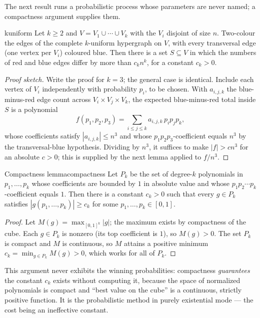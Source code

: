 The next result runs a probabilistic process whose parameters are never named;
a compactness argument supplies them.

\begin{theorem}{}{kuniform}
Let $k\ge2$ and $V=V_1\cup\cdots\cup V_k$ with the $V_i$ disjoint of size $n$.
Two-colour the edges of the complete $k$-uniform hypergraph on $V$, with every
transversal edge (one vertex per $V_i$) coloured blue. Then there is a set
$S\subseteq V$ in which the numbers of red and blue edges differ by more than
$c_k n^k$, for a constant $c_k>0$.
\end{theorem}

\begin{proof}[Proof sketch]
Write the proof for $k=3$; the general case is identical. Include each vertex
of $V_i$ independently with probability $p_i$, to be chosen. With
$a_{i,j,k}$ the blue-minus-red edge count across $V_i\times V_j\times V_k$,
the expected blue-minus-red total inside $S$ is a polynomial
\[
  f(p_1,p_2,p_3)=\sum_{i\le j\le k}a_{i,j,k}\,p_ip_jp_k,
\]
whose coefficients satisfy $|a_{i,j,k}|\le n^3$ and whose
$p_1p_2p_3$-coefficient equals $n^3$ by the transversal-blue hypothesis.
Dividing by $n^3$, it suffices to make $|f|>cn^3$ for an absolute $c>0$; this
is supplied by the next lemma applied to $f/n^3$.
\end{proof}

\begin{lemma}{Compactness lemma}{compactness}
Let $P_k$ be the set of degree-$k$ polynomials in $p_1,\dots,p_k$ whose
coefficients are bounded by $1$ in absolute value and whose
$p_1p_2\cdots p_k$-coefficient equals $1$. Then there is a constant $c_k>0$
such that every $g\in P_k$ satisfies $|g(p_1,\dots,p_k)|\ge c_k$ for some
$p_1,\dots,p_k\in[0,1]$.
\end{lemma}

\begin{proof}
Let $M(g)=\max_{[0,1]^k}|g|$; the maximum exists by compactness of the cube.
Each $g\in P_k$ is nonzero (its top coefficient is $1$), so $M(g)>0$. The set
$P_k$ is compact and $M$ is continuous, so $M$ attains a positive minimum
$c_k=\min_{g\in P_k}M(g)>0$, which works for all of $P_k$.
\end{proof}

\begin{insight}
This argument never exhibits the winning probabilities: compactness
\emph{guarantees} the constant $c_k$ exists without computing it, because the
space of normalized polynomials is compact and ``best value on the cube'' is a
continuous, strictly positive function. It is the probabilistic method in
purely existential mode --- the cost being an ineffective constant.
\end{insight}


